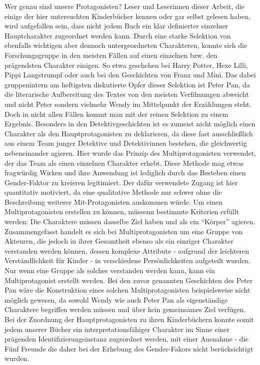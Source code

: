 Wer genau sind unsere Protagonisten? Leser und Leserinnen dieser Arbeit,
die einige der hier untersuchten Kinderbücher kennen oder gar selbst
gelesen haben, wird aufgefallen sein, dass nicht jedem Buch ein klar
definierter einzelner Hauptcharakter zugeordnet werden kann. Durch eine
starke Selektion von ebenfalls wichtigen aber dennoch untergeordneten
Charakteren, konnte sich die Forschungsgruppe in den meisten Fällen auf
einen einzelnen bzw. den prägendsten Charakter einigen. So etwa
geschehen bei Harry Potter, Hexe Lilli, Pippi Langstrumpf oder auch bei
den Geschichten von Franz und Mini. Das dabei gruppenintern am
heftigsten diskutierte Opfer dieser Selektion ist Peter Pan, da die
literarische Aufbereitung des Textes von den meisten Verfilmungen
abweicht und nicht Peter sondern vielmehr Wendy im Mittelpunkt der
Erzählungen steht. Doch in nicht allen Fällen kommt man mit der reinen
Selektion zu einem Ergebnis. Besonders in den Detektivgeschichten ist es
zumeist nicht möglich einen Charakter als den Hauptprotagonisten zu
deklarieren, da diese fast ausschließlich aus einem Team junger
Detektive und Detektivinnen bestehen, die gleichwertig nebeneinander
agieren. Hier wurde das Prinzip des Multiprotagonisten verwendet, der
das Team als einen einzelnen Charakter erhebt. Diese Methode mag etwas
fragwürdig Wirken und ihre Anwendung ist lediglich durch das Besteben
einen Gender-Faktor zu kreieren legitimiert. Der dafür verwendete Zugang
ist hier quantitativ motiviert, da eine qualitative Methode nur schwer
ohne die Beschreibung weiterer Mit-Protagonisten auskommen würde. Um
einen Multiprotagonisten erstellen zu können, müssenn bestimmte
Kriterien erfüllt werden: Die Charaktere müssen dasselbe Ziel haben und
als ein ``Körper'' agieren. Zusammengefasst handelt es sich bei
Multiprotagonisten um eine Gruppe von Akteuren, die jedoch in ihrer
Gesamtheit ebenso als ein einziger Charakter verstanden werden können,
dessen komplexe Attribute - aufgrund der leichteren Verständlichkeit für
Kinder - in verschiedene Persönlichkeiten aufgeteilt wurden. Nur wenn
eine Gruppe als solches verstanden werden kann, kann ein
Multiprotagonist erstellt werden. Bei den zuvor genannten Geschichten
des Peter Pan wäre die Konstruktion eines solchen Multiprotagonisten
beispielsweise nicht möglich gewesen, da sowohl Wendy wie auch Peter Pan
als eigenständige Charaktere begriffen werden müssen und über kein
gemeinsames Ziel verfügen. Bei der Zuordnung der Hauptprotagonisten zu
ihren Kinderbüchern konnte somit jedem unserer Bücher ein
interpretationsfähiger Charakter im Sinne einer prägenden
Identifizierungsinstanz zugeordnet werden, mit einer Ausnahme - die Fünf
Freunde die daher bei der Erhebung des Gender-Fakors nicht
berücksichtigt wurden.

